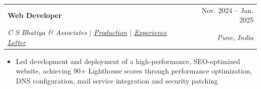 \documentclass[letterpaper,11pt]{article}
\makeatletter
\newcommand{\resumeItem}[1]{
  \item\small{
    {#1 \vspace{-2pt}}
  }
}
\newcommand{\resumeSubheading}[4]{
  \vspace{-2pt}\item
    \begin{tabular*}{0.97\textwidth}[t]{l@{\extracolsep{\fill}}r}
      \textbf{#1} & #2 \\
      \textit{\small#3} & \textit{\small #4} \\
    \end{tabular*}\vspace{-7pt}
}
\newcommand{\resumeSubSubheading}[2]{
    \item
    \begin{tabular*}{0.97\textwidth}{l@{\extracolsep{\fill}}r}
      \textit{\small#1} & \textit{\small #2} \\
    \end{tabular*}\vspace{-7pt}
}
\newcommand{\resumeSubHeadingListEnd}{\end{itemize}}
\newcommand{\resumeItemListStart}{\begin{itemize}}
\newcommand{\resumeItemListEnd}{\end{itemize}\vspace{-5pt}}
\makeatother
\begin{document}


    

\resumeSubheading
  {Web Developer}{Nov. 2024 -- Jan. 2025}
  {C S Bhatiya \& Associates $|$ \href{https://www.csbhatiya.com}{\underline{Production}} $|$ \href{https://drive.google.com/file/d/1ERZEwunqZLcGdk9Fz-A9g0KW0qIyfU5l/view}{\underline{Experience Letter}}}{Pune, India}
  \resumeItemListStart
    
\resumeItem{Led development and deployment of a high-performance, SEO-optimized website, achieving 90+ Lighthouse scores through performance optimization, DNS configuration, mail service integration and security patching}
    
  \resumeItemListEnd

  
\end{document}
